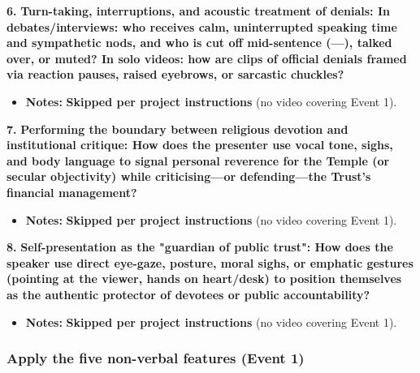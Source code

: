 \documentclass[10pt,a4paper]{article}
\begin{document}
\noindent\textbf{6.} \textbf{Turn-taking, interruptions, and acoustic treatment of denials: In debates/interviews: who receives calm, uninterrupted speaking time and sympathetic nods, and who is cut off mid-sentence (---), talked over, or muted? In solo videos: how are clips of official denials framed via reaction pauses, raised eyebrows, or sarcastic chuckles?}\par\smallskip
\begin{itemize}
  \item \textbf{Notes:}
\textbf{Skipped per project instructions} (no video covering Event 1).\par\smallskip
\end{itemize}

\noindent\textbf{7.} \textbf{Performing the boundary between religious devotion and institutional critique: How does the presenter use vocal tone, sighs, and body language to signal personal reverence for the Temple (or secular objectivity) while criticising---or defending---the Trust's financial management?}\par\smallskip
\begin{itemize}
  \item \textbf{Notes:}
\textbf{Skipped per project instructions} (no video covering Event 1).\par\smallskip
\end{itemize}

\noindent\textbf{8.} \textbf{Self-presentation as the "guardian of public trust": How does the speaker use direct eye-gaze, posture, moral sighs, or emphatic gestures (pointing at the viewer, hands on heart/desk) to position themselves as the authentic protector of devotees or public accountability?}\par\smallskip
\begin{itemize}
  \item \textbf{Notes:}
\textbf{Skipped per project instructions} (no video covering Event 1).\par\smallskip
\end{itemize}

\subsubsection*{Apply the five non-verbal features (Event 1)}
\end{document}
